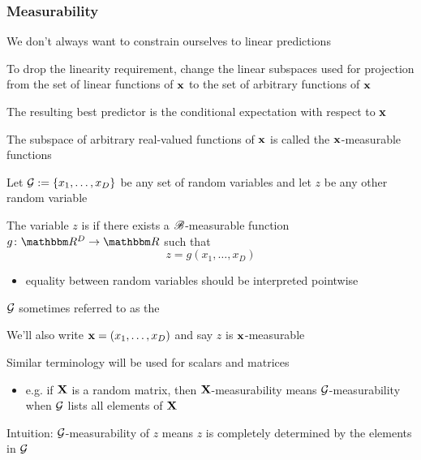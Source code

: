 \begin{frame}\frametitle{Measurability}

    \vspace{2em}
    We don't
    always want to constrain ourselves to linear predictions
    
    To drop the
    linearity requirement, change the linear subspaces used for projection from
    the set of linear functions of ${\mathbf x}$ to the set of arbitrary functions of
    ${\mathbf x}$
    
    The resulting best predictor is the conditional
    expectation with respect to ${\mathbf x}$

\end{frame}

\begin{frame}
    
    \vspace{2em}
    The subspace of arbitrary real-valued functions of
    ${\mathbf x}$ is called the ${\mathbf x}$-measurable functions

    Let $\mathcal G := \{x_1, \ldots, x_D\}$ be any set of random variables
    and let $z$ be any other random variable
    
    The variable $z$ is  if
    there exists a $\mathscr B$-measurable function $g \colon \RR^D \to \RR$ such that
    \begin{equation*}
        \label{eq:gmeas}
        z = g(x_1, \ldots, x_D)
    \end{equation*}
    \begin{itemize}
        \item equality between random variables should be interpreted
            pointwise
    \end{itemize}
    
\end{frame}

\begin{frame}

    \vspace{2em}
    $\mathcal G$ sometimes referred to as the 
    
    We'll also write ${\mathbf x} = (x_1, \ldots, x_D)$ and say
    $z$ is ${\mathbf x}$-measurable
    
    Similar terminology will be used for scalars and
    matrices
    \begin{itemize}
        \item e.g. if $\mathbf X$ is a random matrix, then
        $\mathbf X$-measurability means $\mathcal G$-measurability when $\mathcal G$ lists all elements
    of $\mathbf X$
    \end{itemize}
    
    \vspace{1em}
    Intuition: $\mathcal G$-measurability of $z$ means $z$ is completely
    determined by the elements in $\mathcal G$
    
\end{frame}

